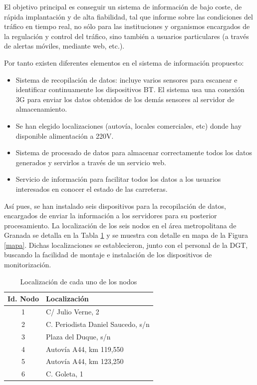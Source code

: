 \documentclass[twocolumn,twoside]{Jornadas}
\begin{document}
El objetivo principal es conseguir un sistema de información de bajo coste, de rápida implantación y de alta fiabilidad, tal que informe sobre las 
condiciones del tráfico en tiempo real, no sólo para las instituciones y organismos encargados de la regulación y control del tráfico, 
sino también a usuarios particulares (a través de alertas móviles, mediante web, etc.). 

Por tanto existen diferentes elementos en el sistema de información propuesto:

\begin{itemize}

  \item Sistema de recopilación de datos: incluye varios sensores para escanear e identificar continuamente los dispositivos BT. El sistema usa una conexión 3G para enviar los datos obtenidos de los demás sensores al servidor de almacenamiento.
  
  \item Se han elegido localizaciones (autovía, locales comerciales, etc) donde hay disponible alimentación a 220V.

  \item Sistema de procesado de datos para almacenar correctamente todos los datos generados y servirlos a través de un servicio web.

  \item Servicio de información para facilitar todos los datos a los usuarios interesados en conocer el estado de las carreteras.

\end{itemize}

Así pues, se han instalado seis dispositivos para la recopilación de datos, encargados de enviar la información a los servidores para su posterior procesamiento. 
La localización de los seis nodos en el área metropolitana de Granada se detalla en la Tabla \ref{localizaciones} y se muestra con detalle en mapa de la Figura \ref{mapa}.
Dichas localizaciones se establecieron, junto con el personal de la DGT, buscando la facilidad de montaje e instalación de los dispositivos de monitorización.

 \begin{table}
 \caption{Localización de cada uno de los nodos
 \label{localizaciones}}
 \begin{center}
 \begin{tabular}{|c|l|}
 \hline
Id. Nodo  &  Localización      \\
 \hline
    1     &  C/ Julio Verne, 2    \\
 \hline
    2     &  C. Periodista Daniel Saucedo, s/n    \\
 \hline
    3     &  Plaza del Duque, s/n    \\
 \hline
    4     &  Autovía A44, km 119,550    \\
 \hline
    5     &  Autovía A44, km 123,250    \\
 \hline
    6     &  C. Goleta, 1    \\
 \hline
 \end{tabular}
 \end{center}
 \end{table}
\end{document}
